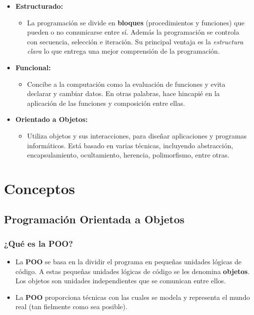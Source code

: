\documentclass{beamer}
\begin{document}
\begin{frame}
  
  \begin{itemize}
  \item \textbf{Estructurado:}
    \begin{itemize}
    \item La programación se divide en \textbf{bloques}
      (procedimientos y funciones) que pueden o no comunicarse entre
      sí. Además la programación se controla con secuencia,
      selección e iteración. Su principal ventaja es la
      \emph{estructura clara} lo que entrega una mejor comprensión
      de la programación.
    \end{itemize}
    
  \item \textbf{Funcional:} 
    \begin{itemize}
    \item Concibe a la computación como la evaluación de funciones y
      evita declarar y cambiar datos. En otras palabras, hace
      hincapié en la aplicación de las funciones y composición entre
      ellas.
    \end{itemize}

  \item \textbf{Orientado a Objetos:}
    \begin{itemize}
    \item Utiliza objetos y sus interacciones, para diseñar
      aplicaciones y programas informáticos. Está basado en varias
      técnicas, incluyendo abstracción, encapsulamiento, ocultamiento,
      herencia, polimorfismo, entre otras.
    \end{itemize}
    
  \end{itemize}
\end{frame}

\section{Conceptos}

\subsection{Programación Orientada a Objetos}
\begin{frame}
  \frametitle{¿Qué es la POO?}

  \begin{exampleblock}{}
    \begin{itemize}
    \item[] La \textbf{POO} se basa en la dividir el programa en peque\~nas unidades lógicas de código. A estas peque\~nas unidades lógicas de código se les denomina \textbf{objetos}. Los objetos son unidades independientes que se comunican entre ellos.\\
    \item[] La \textbf{POO} proporciona técnicas con las cuales se
      modela y representa el mundo real (tan fielmente como sea
      posible).
    \end{itemize}
  \end{exampleblock}
\end{frame}
\end{document}
